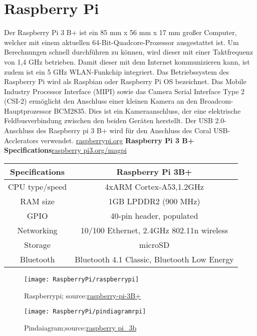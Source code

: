 %
%





\section{Raspberry Pi}

Der Raspberry Pi 3 B+ ist ein 85 mm x 56 mm x 17 mm großer Computer, welcher mit einem aktuellen 64-Bit-Quadcore-Prozessor ausgestattet ist. Um Berechnungen schnell durchführen zu können, wird dieser mit einer Taktfrequenz von 1,4 GHz betrieben.
Damit dieser mit dem Internet kommunizieren kann, ist zudem ist ein 5 GHz WLAN-Funkchip integriert.
Das Betriebssystem des Raspberry Pi wird als Raspbian oder Raspberry Pi OS bezeichnet.
Das Mobile Industry Processor Interface (MIPI) sowie das Camera Serial Interface Type 2 (CSI-2) ermöglicht den Anschluss einer kleinen Kamera an den Broadcom-Hauptprozessor BCM2835. Dies ist ein Kameraanschluss, der eine elektrische Feldbusverbindung zwischen den beiden Geräten herstellt. Der USB 2.0-Anschluss des Raspberry pi 3 B+ wird für den Anschluss des Coral USB-Acclerators verwendet. 
\href{https://www.raspberrypi.org/products/raspberry-pi-3-model-b-plus/}{raspberrypi.org}
\clearpage
\textbf{Raspberry Pi 3 B+ Specifications}\href{https://www.raspberrypi.org/magpi/raspberry-pi-3-specs-benchmarks/}{raspberry pi3.org/magpi}
\begin{center}
 \begin{tabular}{
|c| c|} 
 \hline
 Specifications &Raspberry Pi 3B+\\
 \hline\hline
  CPU type/speed&4xARM Cortex-A53,1.2GHz \\ 
 \hline
 RAM size& 1GB LPDDR2 (900 MHz)\\
 \hline
 GPIO& 40-pin header, populated\\
 \hline
 Networking &10/100 Ethernet, 2.4GHz 802.11n wireless\\
 \hline
 Storage&microSD\\
 \hline
 Bluetooth & Bluetooth 4.1 Classic, Bluetooth Low Energy\\
 \hline
 \end{tabular}
\end{center}

\begin{figure}[!h]
\centering
\texttt{[image: RaspberryPi/raspberrypi]} 
\caption{Raspberrypi; source:\href{https://www.raspberrypi.org/products/raspberry-pi-3-model-b-plus/}{raspberry-pi-3B+} }
\end{figure}
\begin{figure}[!h]
\centering
\texttt{[image: RaspberryPi/pindiagramrpi]}
\caption{Pindaiagram;source:\href {https://www.mobilefish.com/images/developer/raspberry\_pi3\_model\_b\_pin\_diagram.jpg}{raspberry pi\_3b}}
\end{figure}
\clearpage

